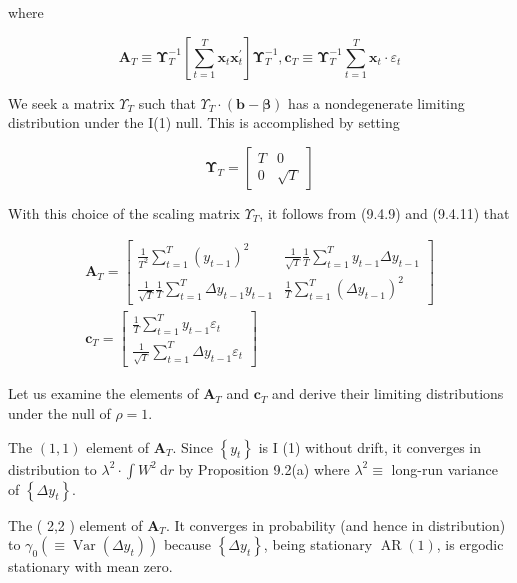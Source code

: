 \documentclass[10pt]{article}
\begin{document}
where


\begin{equation*}
\mathbf{A}_{T} \equiv \boldsymbol{\Upsilon}_{T}^{-1}\left[\sum_{t=1}^{T} \mathbf{x}_{t} \mathbf{x}_{t}^{\prime}\right] \boldsymbol{\Upsilon}_{T}^{-1}, \mathbf{c}_{T} \equiv \boldsymbol{\Upsilon}_{T}^{-1} \sum_{t=1}^{T} \mathbf{x}_{t} \cdot \varepsilon_{t} \tag{9.4.11}
\end{equation*}


We seek a matrix $\Upsilon_{T}$ such that $\Upsilon_{T} \cdot(\mathbf{b}-\boldsymbol{\beta})$ has a nondegenerate limiting distribution under the I(1) null. This is accomplished by setting

\[
\mathbf{\Upsilon}_{T}=\left[\begin{array}{cc}
T & 0  \tag{9.4.12}\\
0 & \sqrt{T}
\end{array}\right]
\]

With this choice of the scaling matrix $\Upsilon_{T}$, it follows from (9.4.9) and (9.4.11) that


\begin{gather*}
\mathbf{A}_{T}=\left[\begin{array}{cc}
\frac{1}{T^{2}} \sum_{t=1}^{T}\left(y_{t-1}\right)^{2} & \frac{1}{\sqrt{T}} \frac{1}{T} \sum_{t=1}^{T} y_{t-1} \Delta y_{t-1} \\
\frac{1}{\sqrt{T}} \frac{1}{T} \sum_{t=1}^{T} \Delta y_{t-1} y_{t-1} & \frac{1}{T} \sum_{t=1}^{T}\left(\Delta y_{t-1}\right)^{2}
\end{array}\right] \\
\mathbf{c}_{T}=\left[\begin{array}{c}
\frac{1}{T} \sum_{t=1}^{T} y_{t-1} \varepsilon_{t} \\
\frac{1}{\sqrt{T}} \sum_{t=1}^{T} \Delta y_{t-1} \varepsilon_{t}
\end{array}\right] \tag{9.4.13}
\end{gather*}


Let us examine the elements of $\mathbf{A}_{T}$ and $\mathbf{c}_{T}$ and derive their limiting distributions under the null of $\rho=1$.

The $(1,1)$ element of $\mathbf{A}_{T}$. Since $\left\{y_{t}\right\}$ is I (1) without drift, it converges in distribution to $\lambda^{2} \cdot \int W^{2} \mathrm{~d} r$ by Proposition 9.2(a) where $\lambda^{2} \equiv$ long-run variance of $\left\{\Delta y_{t}\right\}$.

The ( 2,2 ) element of $\mathbf{A}_{T}$. It converges in probability (and hence in distribution) to $\gamma_{0}\left(\equiv \operatorname{Var}\left(\Delta y_{t}\right)\right)$ because $\left\{\Delta y_{t}\right\}$, being stationary $\operatorname{AR}(1)$, is ergodic stationary with mean zero.
\end{document}
